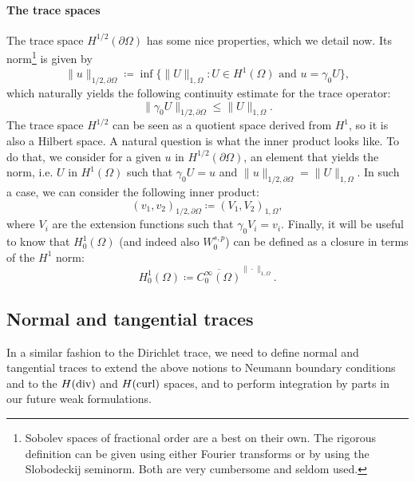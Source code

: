 \paragraph{The trace spaces} The trace space $H^{1/2}(\partial\Omega)$ has some nice properties, which we detail now. Its norm\footnote{Sobolev spaces of fractional order are a best on their own. The rigorous definition can be given using either Fourier transforms or by using the Slobodeckij seminorm. Both are very cumbersome and seldom used.} is given by 
\begin{equation}\label{eq:norm-trace-1/2}
    \| u \|_{1/2,\partial\Omega} \coloneqq \inf\{\|U\|_{1,\Omega}: U \in H^1(\Omega) \text{ and } u = \gamma_0 U\},
\end{equation}
which naturally yields the following continuity estimate for the trace operator: 
\begin{equation}
    \| \gamma_0 U\|_{1/2,\partial\Omega} \leq \| U \|_{1,\Omega} .
\end{equation}
The trace space $H^{1/2}$ can be seen as a quotient space derived from $H^1$, so it is also a Hilbert space. A natural question is what the inner product looks like. To do that, we consider for a given $u$ in $H^{1/2}(\partial\Omega)$, an element that yields the norm, i.e. $U$ in $H^1(\Omega)$ such that $\gamma_0 U = u$ and $\| u \|_{1/2,\partial\Omega} = \| U \|_{1,\Omega}$. In such a case, we can consider the following inner product: 
\begin{equation}\label{eq:inner-product-trace-1/2}
    (v_1, v_2)_{1/2,\partial\Omega} \coloneqq (V_1, V_2)_{1,\Omega},
\end{equation}
where $V_i$ are the extension functions such that $\gamma_0 V_i = v_i$. Finally, it will be useful to know that $H_0^1(\Omega)$ (and indeed also $W_0^{s,p}$) can be defined as a closure in terms of the $H^1$ norm: 
\begin{equation}\label{eq:def-H01-closure}
    H_0^1(\Omega) \coloneqq \overline{C_0^\infty(\Omega)}^{\|\cdot \|_{1,\Omega}}.
\end{equation}
\subsection{Normal and tangential traces}
In a similar fashion to the Dirichlet trace, we need to define normal and tangential traces to extend the above notions to Neumann boundary conditions and to the $H(\operatorname{\text{div}})$ and $H(\operatorname{\text{curl}})$ spaces, and to perform integration by parts in our future weak formulations.

